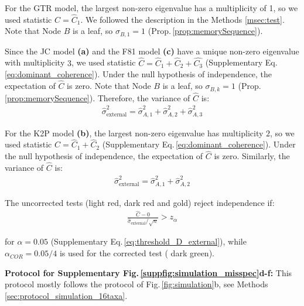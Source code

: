 \begin{appendices}

\medskip
For the GTR model, the largest non-zero eigenvalue has a multiplicity of
1, so we used statistic $\hat C = \hat{C}_1$. We followed the description in the Methods \ref{msec:test}. Note that Node $B$ is a leaf, so $\sigma_{B,1}=1$ (Prop.\,\ref{prop:memorySequence}).

Since the JC model \textbf{(a)} and the F81 model \textbf{(c)} have a unique non-zero eigenvalue with multiplicity $3$, we used statistic $\hat{C} = \hat{C}_1+\hat{C}_2+\hat{C_3}$ (Supplementary Eq.\,\eqref{eq:dominant_coherence}).  Under the null hypothesis of independence, the expectation of $\hat{C}$ is zero. Note that Node $B$ is a leaf, so $\sigma_{B,k}=1$ (Prop.\,\ref{prop:memorySequence}). Therefore, the variance of $\hat C$ is:
\begin{align*}
  \hat{\sigma}^2_{\text{external}} =  \hat{\sigma}^2_{A,1}+\hat{\sigma}^2_{A,2}+\hat{\sigma}^2_{A,3}
\end{align*}

 For the K2P model \textbf{(b)}, the largest non-zero eigenvalue  has multiplicity $2$, so we used statistic $\hat{C} = \hat{C}_1+\hat{C}_2$ (Supplementary Eq.\,\eqref{eq:dominant_coherence}). Under the null hypothesis of independence, the expectation of $\hat{C}$ is zero. Similarly, the variance of $\hat C$ is:
\begin{align*}
  \hat{\sigma}^2_{\text{external}} =  \hat{\sigma}^2_{A,1}+\hat{\sigma}^2_{A,2}
\end{align*}

The uncorrected tests ({\color{truetree}light red}, {\color{truetreeML} dark red} and {\color{truetreeNoMisspecification}gold}) reject independence if:
\begin{align*}
 \frac{\hat{C}-0}{\hat{\sigma}_{\text{external}}/\sqrt{n}} > z_\alpha 
\end{align*}

for $\alpha=0.05$ (Supplementary Eq.\,\eqref{eq:threshold_D_external}), while $\alpha_{COR}=0.05/4$  is used for the corrected test ({\color{MLtreeBonferroni} dark green}).

\medskip

\noindent\textbf{Protocol for Supplementary Fig.\,\ref{suppfig:simulation_misspec}d-f:}\label{subsec:misspec_16tree} This protocol mostly follows the protocol of Fig.\,\ref{fig:simulation}b, see Methods \ref{sec:protocol_simulation_16taxa}.


\end{appendices}
